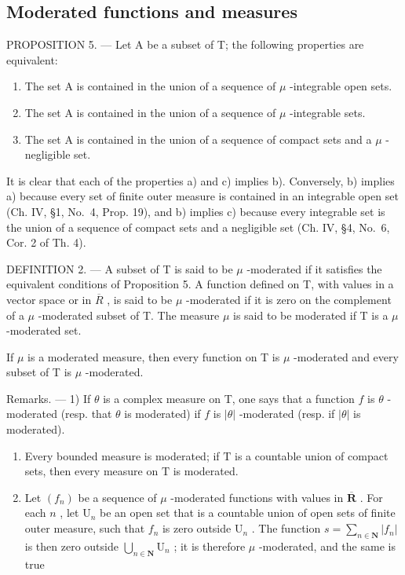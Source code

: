\subsection{Moderated functions and measures}

PROPOSITION 5. --- Let A be a subset of T; the following properties are equivalent:

\begin{enumerate}
\def\labelenumi{\alph{enumi})}
\item
  The set A is contained in the union of a sequence of \(\mu\) -integrable open sets.
\item
  The set A is contained in the union of a sequence of \(\mu\) -integrable sets.
\item
  The set A is contained in the union of a sequence of compact sets and a \(\mu\) -negligible set.
\end{enumerate}

It is clear that each of the properties a) and c) implies b). Conversely, b) implies a) because every set of finite outer measure is contained in an integrable open set (Ch. IV, §1, No.~4, Prop. 19), and b) implies c) because every integrable set is the union of a sequence of compact sets and a negligible set (Ch. IV, §4, No.~6, Cor. 2 of Th. 4).

DEFINITION 2. --- A subset of T is said to be \(\mu\) -moderated if it satisfies the equivalent conditions of Proposition 5. A function defined on T, with values in a vector space or in \(\overline{R}\) , is said to be \(\mu\) -moderated if it is zero on the complement of a \(\mu\) -moderated subset of T. The measure \(\mu\) is said to be moderated if T is a \(\mu\) -moderated set.

If \(\mu\) is a moderated measure, then every function on T is \(\mu\) -moderated and every subset of T is \(\mu\) -moderated.

Remarks. --- 1) If \(\theta\) is a complex measure on T, one says that a function \(f\) is \(\theta\) -moderated (resp. that \(\theta\) is moderated) if \(f\) is \(|\theta|\) -moderated (resp. if \(|\theta|\) is moderated).

\begin{enumerate}
\def\labelenumi{\arabic{enumi})}
\setcounter{enumi}{1}
\item
  Every bounded measure is moderated; if \(\mathrm{T}\) is a countable union of compact sets, then every measure on \(\mathrm{T}\) is moderated.
\item
  Let \((f_n)\) be a sequence of \(\mu\) -moderated functions with values in \(\overline{\mathbf{R}}\) . For each \(n\) , let \(\mathrm{U}_n\) be an open set that is a countable union of open sets of finite outer measure, such that \(f_n\) is zero outside \(\mathrm{U}_n\) . The function \(s = \sum_{n \in \mathbf{N}} |f_n|\) is then zero outside \(\bigcup_{n\in \mathbf{N}}\mathrm{U}_n\) ; it is therefore \(\mu\) -moderated, and the same is true
\end{enumerate}

